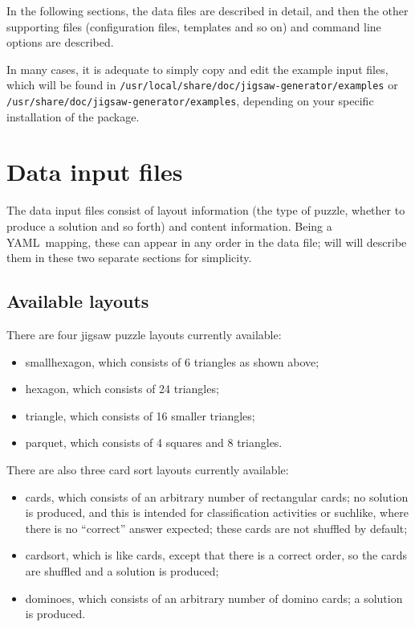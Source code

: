 \documentclass{article}
\def\YAML{{\small YAML}}
\begin{document}
In the following sections, the data files are described in detail, and
then the other supporting files (configuration files, templates and so
on) and command line options are described.

In many cases, it is adequate to simply copy and edit the example
input files, which will be found in
\nolinkurl{/usr/local/share/doc/jigsaw-generator/examples} or
\nolinkurl{/usr/share/doc/jigsaw-generator/examples}, depending on
your specific installation of the package.

\section{Data input files}

The data input files consist of layout information (the type of
puzzle, whether to produce a solution and so forth) and content
information.  Being a \YAML\ mapping, these can appear in any order in
the data file; will will describe them in these two separate sections
for simplicity.

\subsection{Available layouts}

There are four jigsaw puzzle layouts currently available:
\begin{itemize}
\item smallhexagon, which consists of 6 triangles as shown above;
\item hexagon, which consists of 24 triangles;
\item triangle, which consists of 16 smaller triangles;
\item parquet, which consists of 4 squares and 8 triangles.
\end{itemize}

There are also three card sort layouts currently available:
\begin{itemize}
\item cards, which consists of an arbitrary number of rectangular
  cards; no solution is produced, and this is intended for
  classification activities or suchlike, where there is no ``correct''
  answer expected; these cards are not shuffled by default;
\item cardsort, which is like cards, except that there is a correct
  order, so the cards are shuffled and a solution is produced;
\item dominoes, which consists of an arbitrary number of domino cards;
  a solution is produced.
\end{itemize}
\end{document}
